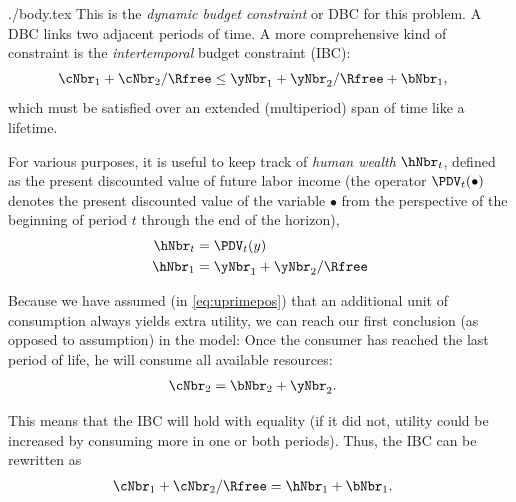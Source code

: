 \documentclass{handout}
\begin{document}
\begin{verbatimwrite}{./body.tex}
  This is the \textit{dynamic budget constraint} or DBC for this problem.
  A DBC links two adjacent periods of time.  A more comprehensive kind
  of constraint is the \textit{intertemporal} budget constraint (IBC):
  \begin{equation}\begin{gathered}\begin{aligned}
        \cNbr_{1}+\cNbr_{2}/\Rfree & \leq  \yNbr_{1}+\yNbr_{2}/\Rfree+\bNbr_{1} \label{eq:ibcineq},
      \end{aligned}\end{gathered}\end{equation}
  which must be satisfied over an extended (multiperiod) span of time like a lifetime.  

  For various purposes, it is useful to keep track of \textit{human wealth}
  $\hNbr_{t}$, defined as the present discounted value of future labor
  income (the operator $\PDV_{t}(\bullet)$ denotes the present
  discounted value of the variable $\bullet$ from the perspective of the
  beginning of period $t$ through the end of the horizon),
  \begin{equation}\begin{gathered}\begin{aligned}
        \hNbr_{t} & =  \PDV_{t}(y) \label{eq:humw}
        \\  \hNbr_{1} & =  \yNbr_{1}+\yNbr_{2}/\Rfree  
      \end{aligned}\end{gathered}\end{equation}

  Because we have assumed (in \eqref{eq:uprimepos}) that an additional
  unit of consumption always yields extra utility,
  we can reach our first conclusion (as opposed to assumption) in the
  model: Once the consumer has reached the last period of life,
  he will consume all available resources:
  \begin{equation}\begin{gathered}\begin{aligned}
        \cNbr_{2} & =  \bNbr_{2}+\yNbr_{2}.
      \end{aligned}\end{gathered}\end{equation}

  This means that the IBC will hold with equality (if it did not, utility
  could be increased by consuming more in one or both periods).  Thus,
  the IBC can be rewritten as
  \begin{equation}\begin{gathered}\begin{aligned}
        \cNbr_{1}+\cNbr_{2}/\Rfree & =  \hNbr_{1}+\bNbr_{1} \label{eq:ibc}.
      \end{aligned}\end{gathered}\end{equation}


\end{verbatimwrite}
\end{document}
